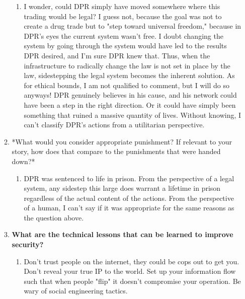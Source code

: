 \documentclass[letterpaper]{article}
\begin{document}
\begin{enumerate}
\begin{enumerate}
\begin{enumerate}
\item I wonder, could DPR simply have moved somewhere where this trading
would be legal? I guess not, because the goal was not to create a
drug trade but to "step toward universal freedom," because in
DPR's eyes the current system wasn't free. I doubt changing the
system by going through the system would have led to the results
DPR desired, and I'm sure DPR knew that. Thus, when the
infrastructure to radically change the law is not set in place by
the law, sidestepping the legal system becomes the inherent
solution. As for ethical bounds, I am not qualified to comment,
but I will do so anyways! DPR genuinely believes in his cause, and
his network could have been a step in the right direction. Or it
could have simply been something that ruined a massive quantity of
lives. Without knowing, I can't classify DPR's actions from a
utilitarian perspective.
\end{enumerate}

\item *What would you consider appropriate punishment? If relevant to your
story, how does that compare to the punishments that were handed
down?*

\begin{enumerate}
\item DPR was sentenced to life in prison. From the perspective of a
legal system, any sidestep this large does warrant a lifetime in
prison regardless of the actual content of the actions. From the
perspective of a human, I can't say if it was appropriate for the
same reasons as the question above.
\end{enumerate}

\item \textbf{What are the technical lessons that can be learned to improve
security?}

\begin{enumerate}
\item Don't trust people on the internet, they could be cops out to get
you. Don't reveal your true IP to the world. Set up your
information flow such that when people "flip" it doesn't
compromise your operation. Be wary of social engineering tactics.
\end{enumerate}
\end{enumerate}
\end{enumerate}
\end{document}
